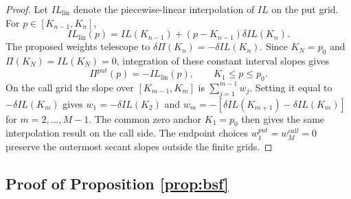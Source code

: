 \documentclass[pdftex,11pt,a4paper] {article}
\begin{document}
\begin{proof}
Let $IL_{\mathrm{lin}}$ denote the piecewise-linear interpolation of $IL$ on the put grid. For $p\in[K_{n-1},K_n]$,
\begin{equation} \label{eq:ph10}
IL_{\mathrm{lin}}(p)=IL(K_{n-1})+(p-K_{n-1})\delta IL(K_n).
\end{equation}
The proposed weights telescope to $\delta\Pi(K_n)=-\delta IL(K_n)$. Since $K_N=p_0$ and $\Pi(K_N)=IL(K_N)=0$, integration of these constant interval slopes gives
\begin{equation} \label{eq:ph11}
\Pi^{put}(p)=-IL_{\mathrm{lin}}(p),\qquad K_1\leq p\leq p_0.
\end{equation}
On the call grid the slope over $[K_{m-1},K_m]$ is $\sum_{j=1}^{m-1}w_j$. Setting it equal to $-\delta IL(K_m)$ gives $w_1=-\delta IL(K_2)$ and $w_m=-[\delta IL(K_{m+1})-\delta IL(K_m)]$ for $m=2,\ldots,M-1$. The common zero anchor $K_1=p_0$ then gives the same interpolation result on the call side. The endpoint choices $w_1^{put}=w_M^{call}=0$ preserve the outermost secant slopes outside the finite grids.

\end{proof}

\subsection{Proof of Proposition \protect\ref{prop:bsf}}

\label{ap_prop:bsf}
\end{document}
